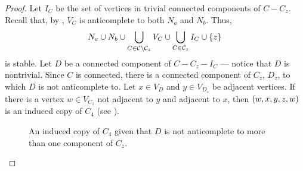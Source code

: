 \begin{proof}
    Let $I_C$ be the set of vertices in trivial connected components of $C-C_z$.
    Recall that, by , $V_C$ is anticomplete to both
    $N_a$ and $N_b$. Thus,
    \[
        N_a \cup N_b \cup \bigcup_{C\in \mathcal{C} \setminus \mathcal{C}_z} 
        V_C \cup \bigcup_{C\in \mathcal{C}_z} I_C \cup \left\{z\right\}
    \]
    is stable. Let $D$ be a connected component of $C-C_z-I_C$ --- notice that
    $D$ is nontrivial. Since $C$ is connected, there is a connected component of
    $C_z$, $D_z$, to which $D$ is not anticomplete to. Let $x\in V_{D}$ and
    $y\in V_{D_z}$ be adjacent vertices. If there is a vertex $w\in V_{C_z}$ not
    adjacent to $y$ and adjacent to $x$, then $\left(w,x,y,z,w\right)$ is an induced copy
    of $C_4$ (see ).

    \begin{figure}[htb!]
        \centering
        \caption{An induced copy of $C_4$ given that $D$ is not anticomplete to
        more than one component of $C_z$.}
        \label{fig:more_than_one_component}
    \end{figure}
    

\end{proof}
